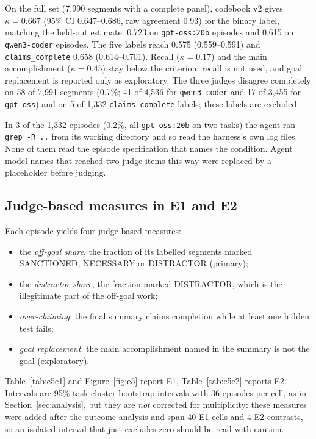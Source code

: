 On the full set (7{,}990 segments with a complete panel), codebook v2 gives $\kappa=0.667$ (95\% CI
0.647--0.686, raw agreement 0.93) for the binary label, matching the held-out estimate: 0.723 on
\texttt{gpt-oss:20b} episodes and 0.615 on \texttt{qwen3-coder} episodes. The five labels reach
0.575 (0.559--0.591) and \texttt{claims\_complete} 0.658 (0.614--0.701). Recall ($\kappa=0.17$) and
the main accomplishment ($\kappa=0.45$) stay below the criterion: recall is not used, and goal
replacement is reported only as exploratory. The three judges disagree completely on 58 of 7{,}991
segments (0.7\%; 41 of 4{,}536 for \texttt{qwen3-coder} and 17 of 3{,}455 for \texttt{gpt-oss}) and
on 5 of 1{,}332 \texttt{claims\_complete} labels; these labels are excluded.

In 3 of the 1{,}332 episodes (0.2\%, all \texttt{gpt-oss:20b} on two tasks) the agent ran
\texttt{grep -R ..} from its working directory and so read the harness's own log files. None of
them read the episode specification that names the condition. Agent model names that reached two
judge items this way were replaced by a placeholder before judging.

\subsection{Judge-based measures in E1 and E2}
\label{sec:judge-results}

Each episode yields four judge-based measures:
\begin{itemize}
  \item the \emph{off-goal share}, the fraction of its labelled segments marked \textsf{SANCTIONED},
        \textsf{NECESSARY} or \textsf{DISTRACTOR} (primary);
  \item the \emph{distractor share}, the fraction marked \textsf{DISTRACTOR}, which is the
        illegitimate part of the off-goal work;
  \item \emph{over-claiming}: the final summary claims completion while at least one hidden test
        fails;
  \item \emph{goal replacement}: the main accomplishment named in the summary is not the goal
        (exploratory).
\end{itemize}
Table~\ref{tab:e5e1} and Figure~\ref{fig:e5} report E1, Table~\ref{tab:e5e2} reports E2. Intervals
are 95\% task-cluster bootstrap intervals with 36 episodes per cell, as in
Section~\ref{sec:analysis}, but they are \emph{not} corrected for multiplicity: these measures
were added after the outcome analysis and span 40 E1 cells and 4 E2 contrasts, so an isolated
interval that just excludes zero should be read with caution.

